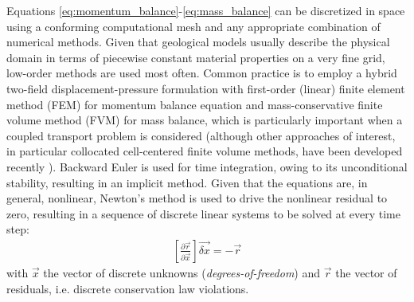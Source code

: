 Equations \eqref{eq:momentum_balance}-\eqref{eq:mass_balance} can be discretized in space using a conforming computational mesh and any appropriate combination of numerical methods.   Given that geological models usually describe the physical domain in terms of piecewise constant material properties on a very fine grid, low-order methods are used most often.   Common practice is to employ a hybrid two-field displacement-pressure formulation with first-order (linear) finite element method (FEM) for momentum balance equation and mass-conservative finite volume method (FVM) for mass balance, which is particularly important when a coupled transport problem is considered (although other approaches of interest, in particular collocated cell-centered finite volume methods, have been developed recently \cite{Nordbotten2016,Terekhov2020}).   Backward Euler is used for time integration, owing to its unconditional stability, resulting in an implicit method.   Given that the equations are, in general, nonlinear, Newton's method is used to drive the nonlinear residual to zero, resulting in a sequence of discrete linear systems to be solved at every time step:
\begin{align}
    \left[\frac{\partial \vec{r}}{\partial \vec{x}}\right] \vec{\delta x} = -\vec{r}
\end{align}
with $\vec{x}$ the vector of discrete unknowns (\textit{degrees-of-freedom}) and $\vec{r}$ the vector of residuals, i.e. discrete conservation law violations.

